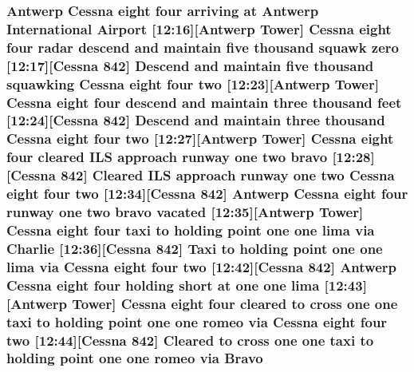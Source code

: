 \subsubsection[{\texorpdfstring{Bravo}{Bravo}}]{\setlength{\rightskip}{0pt plus 5cm}Antwerp {\bf Cessna} eight four arriving at Antwerp International {\bf Airport} \mbox{[}12\+:16\mbox{]}\mbox{[}Antwerp {\bf Tower}\mbox{]} {\bf Cessna} eight four radar descend and maintain five {\bf thousand} squawk {\bf zero} \mbox{[}12\+:17\mbox{]}\mbox{[}{\bf Cessna} 842\mbox{]} Descend and maintain five {\bf thousand} {\bf squawking} {\bf Cessna} eight four {\bf two} \mbox{[}12\+:23\mbox{]}\mbox{[}Antwerp {\bf Tower}\mbox{]} {\bf Cessna} eight four descend and maintain three {\bf thousand} {\bf feet} \mbox{[}12\+:24\mbox{]}\mbox{[}{\bf Cessna} 842\mbox{]} Descend and maintain three {\bf thousand} {\bf Cessna} eight four {\bf two} \mbox{[}12\+:27\mbox{]}\mbox{[}Antwerp {\bf Tower}\mbox{]} {\bf Cessna} eight four cleared I\+LS approach runway {\bf one} {\bf two} {\bf bravo} \mbox{[}12\+:28\mbox{]}\mbox{[}{\bf Cessna} 842\mbox{]} Cleared I\+LS approach runway {\bf one} {\bf two} {\bf Cessna} eight four {\bf two} \mbox{[}12\+:34\mbox{]}\mbox{[}{\bf Cessna} 842\mbox{]} Antwerp {\bf Cessna} eight four runway {\bf one} {\bf two} {\bf bravo} vacated \mbox{[}12\+:35\mbox{]}\mbox{[}Antwerp {\bf Tower}\mbox{]} {\bf Cessna} eight four taxi to holding point {\bf one} {\bf one} {\bf lima} via {\bf Charlie} \mbox{[}12\+:36\mbox{]}\mbox{[}{\bf Cessna} 842\mbox{]} Taxi to holding point {\bf one} {\bf one} {\bf lima} via {\bf Cessna} eight four {\bf two} \mbox{[}12\+:42\mbox{]}\mbox{[}{\bf Cessna} 842\mbox{]} Antwerp {\bf Cessna} eight four holding short at {\bf one} {\bf one} {\bf lima} \mbox{[}12\+:43\mbox{]}\mbox{[}Antwerp {\bf Tower}\mbox{]} {\bf Cessna} eight four cleared to cross {\bf one} {\bf one} taxi to holding point {\bf one} {\bf one} {\bf romeo} via {\bf Cessna} eight four {\bf two} \mbox{[}12\+:44\mbox{]}\mbox{[}{\bf Cessna} 842\mbox{]} Cleared to cross {\bf one} {\bf one} taxi to holding point {\bf one} {\bf one} {\bf romeo} via Bravo}\hypertarget{happyDay3ATC_8txt_a911138964635093e61b07b4b5b5332fb}{}\label{happyDay3ATC_8txt_a911138964635093e61b07b4b5b5332fb}
